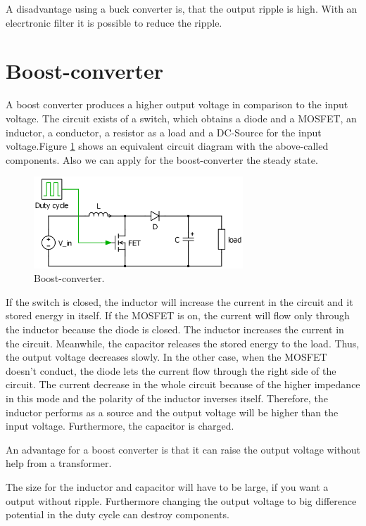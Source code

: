 A disadvantage using a buck converter is, that the output ripple is high. With an elecrtronic filter it is possible to reduce the ripple.\cite{advantagebuck}

\section{Boost-converter\label{Boost-C}}

A boost converter produces a higher output voltage in comparison to the input voltage. The circuit exists of a switch, which obtains a diode and a MOSFET, an inductor, a conductor, a resistor as a load and a DC-Source for the input voltage.Figure \ref{Boost-converter} shows an equivalent circuit diagram with the above-called components. Also we can apply for the boost-converter the steady state.%

\begin{figure}[htbp]
	\begin{center}
		\includegraphics[width=0.7\textwidth]{../Pictures/Boost-converter}
		\caption{Boost-converter.}
		\label{Boost-converter}
	\end{center}	
\end{figure}

If the switch is closed, the inductor will increase the current in the circuit and it stored energy in itself. If the MOSFET is on, the current will flow only through the inductor because the diode is closed. The inductor increases the current in the circuit. Meanwhile, the capacitor releases the stored energy to the load. Thus, the output voltage decreases slowly. In the other case, when the MOSFET doesn’t conduct, the diode lets the current flow through the right side of the circuit. The current decrease in the whole circuit because of the higher impedance in this mode and the polarity of the inductor inverses itself. Therefore, the inductor performs as a source and the output voltage will be higher than the input voltage. Furthermore, the capacitor is charged.

An advantage for a boost converter is that it can raise the output voltage without help from a transformer. 

The size for the inductor and capacitor will have to be large, if you want a output without ripple. Furthermore changing the output voltage to big difference potential in the duty cycle can destroy components.\cite{advantageboost}

